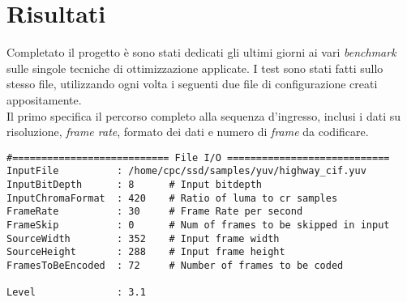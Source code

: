 
\chapter{Risultati} %

\label{Chapter7} %


Completato il progetto è sono stati dedicati gli ultimi giorni ai vari 
\emph{benchmark} sulle singole tecniche di ottimizzazione applicate. 
I test sono stati fatti sullo stesso file, utilizzando ogni volta i seguenti 
due file di configurazione creati appositamente.\\

Il primo specifica il percorso completo alla sequenza d'ingresso, inclusi 
i dati su risoluzione, \emph{frame rate}, formato dei dati e numero di 
\emph{frame} da codificare.

\begin{lstlisting}
#=========================== File I/O ============================
InputFile          : /home/cpc/ssd/samples/yuv/highway_cif.yuv
InputBitDepth      : 8      # Input bitdepth
InputChromaFormat  : 420    # Ratio of luma to cr samples
FrameRate          : 30     # Frame Rate per second
FrameSkip          : 0      # Num of frames to be skipped in input
SourceWidth        : 352    # Input frame width
SourceHeight       : 288    # Input frame height
FramesToBeEncoded  : 72     # Number of frames to be coded
 
Level              : 3.1
\end{lstlisting}

